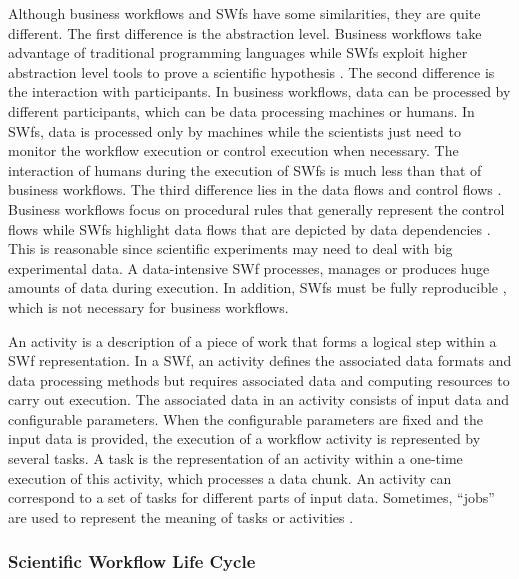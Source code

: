 Although business workflows and SWfs have some similarities,
they are quite different. 
The first difference is the abstraction level. Business workflows take advantage of traditional programming languages while SWfs exploit higher abstraction level tools to prove a scientific hypothesis \cite{Barker2007}. 
The second difference is the interaction
with participants. In business workflows, data can be processed by
different participants, which can be data processing machines or humans.
In SWfs, data is processed only by machines while
the scientists just need to monitor the workflow execution or control
execution when necessary. The interaction of humans during the execution of SWfs is much less than that of business workflows. 
The third
difference lies in the data flows and control flows \cite{Yildiz2009}.
Business workflows focus on procedural rules that generally represent
the control flows while SWfs highlight data flows
that are depicted by data dependencies \cite{Barker2007}. This is reasonable since scientific
experiments may need to deal with big experimental data. A data-intensive SWf processes, manages or produces
huge amounts of data during execution.
In addition, SWfs must be fully reproducible \cite{Barker2007}, which is not necessary for business workflows.

An activity is a description of a piece of work that forms a logical
step within a SWf representation. In a SWf, an activity defines the associated data formats and data
processing methods but requires associated data and computing resources
to carry out execution. The associated data in an activity consists
of input data and configurable parameters. When the configurable parameters
are fixed and the input data is provided, the execution of a workflow
activity is represented by several tasks. A task is the representation
of an activity within a one-time execution of this activity, which
processes a data chunk. An activity can
correspond to a set of tasks for different parts of input data. Sometimes,
\textquotedblleft{}jobs\textquotedblright{} are used to represent the meaning of tasks \cite{Bux2013} or activities \cite{Chen2012a,Deelman2014}.



\subsubsection{Scientific Workflow Life Cycle}
\label{sec:subsub:SWLC}

